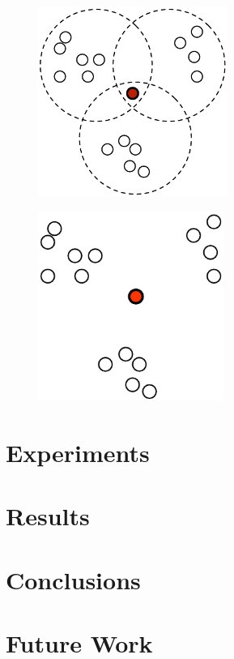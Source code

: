 \documentclass[runningheads,a4paper]{llncs}
\begin{document}
\begin{figure}
  \centering
  \includegraphics[height=6.2cm]{pdf/distributed-pso}
  \caption{}
  \label{distributed-pso}
\end{figure}

\begin{figure}
  \centering
  \includegraphics[height=6.2cm]{pdf/traditional-pso}
  \caption{}
  \label{traditional-pso}
\end{figure}

\section{Experiments}
\label{experiments}

\section{Results}
\label{results}

\section{Conclusions}
\label{conclusions}

\section{Future Work}
\label{future-work}
\end{document}

